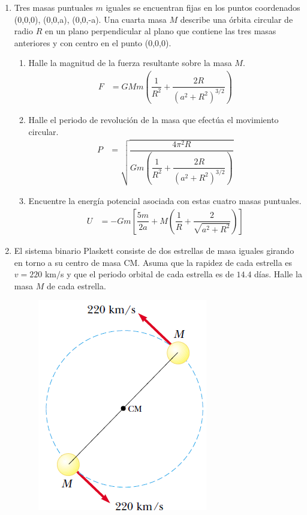 \documentclass[11pt,twocolumn]{article}
\begin{document}
\begin{enumerate}
\item Tres masas puntuales $m$ iguales se encuentran fijas en los puntos coordenados (0,0,0), (0,0,a), (0,0,-a). Una cuarta masa $M$ describe una órbita circular de radio $R$ en un plano perpendicular al plano que contiene las tres masas anteriores y con centro en el punto (0,0,0).
\begin{enumerate}
\item Halle la magnitud de la fuerza resultante sobre la masa $M$.
\begin{align*}
F&=GMm\left(\dfrac{1}{R^2}+\dfrac{2R}{(a^2+R^2)^{3/2}}\right)
\end{align*}
\item Halle el periodo de revolución de la masa que efectúa el movimiento circular.
\begin{align*}
P&=\sqrt{\dfrac{4\pi^2R}{G m\left(\dfrac{1}{R^2}+\dfrac{2R}{(a^2+R^2)^{3/2}}\right)}}
\end{align*}
\item Encuentre la energía potencial asociada con estas cuatro masas puntuales.
\begin{align*}
U&=-Gm\left[\dfrac{5m}{2a}+M\left(\dfrac{1}{R}+\dfrac{2}{\sqrt{a^2+R^2}}\right)\right]
\end{align*}
\end{enumerate}




\item El sistema binario Plaskett consiste de dos estrellas de masa iguales girando en torno a su centro de masa CM. Asuma que la rapidez de cada estrella es $v=220$ km$/$s y que el periodo orbital de cada estrella es de $14.4$ días. Halle la masa $M$ de cada estrella.
\begin{figure}[h]
\centering
\includegraphics[scale=0.5]{fig3}
\end{figure}



\end{enumerate}
\end{document}
